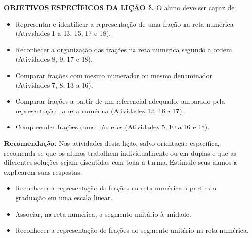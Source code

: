 \begin{multicols}{2}
\noindent \textbf{OBJETIVOS ESPECÍFICOS DA LIÇÃO 3.} O aluno deve ser capaz de:
\vspace{.15cm}

  \begin{itemize}
   \item Representar e identificar a representação de uma fração na reta numérica (Atividades 1 a 13, 15, 17 e 18). 
   \item Reconhecer a organização das frações na reta numérica segundo a ordem (Atividades 8, 9, 17 e 18). 
   \item Comparar frações com mesmo numerador ou mesmo denominador (Atividades 7, 8, 13 a 16).
   \item Comparar frações a partir de um referencial adequado, amparado pela representação na reta numérica (Atividades 12, 16 e 17).
\item Compreender frações como números (Atividades 5, 10 a 16 e 18). 
  \end{itemize}

\textbf{Recomendação:}  Nas atividades desta lição, salvo orientação específica, recomenda-se que os alunos trabalhem individualmente ou em duplas e que as diferentes soluções sejam discutidas com toda a turma. Estimule seus alunos a explicarem suas respostas.




\begin{objetivos}[code={\setcounter{tcb@cnt@objetivos}{0}}, label=chap3-ativ1]{}{}
\begin{itemize} %
    \item Reconhecer a representação de frações na reta numérica a partir da graduação em uma escala linear.
    \item Associar,  na reta numérica, o segmento unitário à unidade.
    \item Reconhecer a representação de frações do segmento unitário na reta numérica.
\end{itemize} %
\end{objetivos}


\end{multicols}
